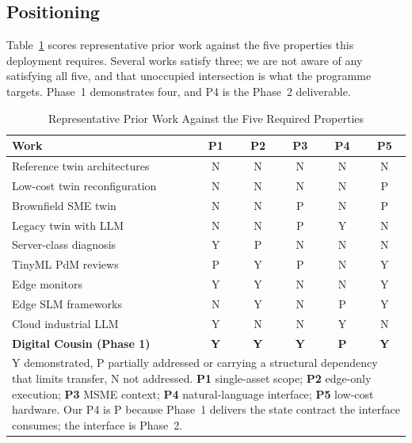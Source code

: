 \documentclass[conference]{IEEEtran}
\begin{document}
\subsection{Positioning}

Table~\ref{tab:gap} scores representative prior work against the five
properties this deployment requires. Several works satisfy three; we are not
aware of any satisfying all five, and that unoccupied intersection is what
the programme targets. Phase~1 demonstrates four, and P4 is the Phase~2
deliverable.

\begin{table}[t]
\caption{Representative Prior Work Against the Five Required Properties}
\label{tab:gap}
\centering
\footnotesize
\setlength{\tabcolsep}{4pt}
\begin{tabular}{|l|c|c|c|c|c|}
\hline
\textbf{Work} & \textbf{P1} & \textbf{P2} & \textbf{P3} & \textbf{P4} & \textbf{P5} \\
\hline
Reference twin architectures \cite{b1,b2,b3} & N & N & N & N & N \\
Low-cost twin reconfiguration \cite{b4} & N & N & N & N & P \\
Brownfield SME twin \cite{b5}     & N & N & P & N & P \\
Legacy twin with LLM \cite{b6}    & N & N & P & Y & N \\
Server-class diagnosis \cite{b10,b11,b13} & Y & P & N & N & N \\
TinyML PdM reviews \cite{b15,b35} & P & Y & P & N & Y \\
Edge monitors \cite{b16,b17,b20}  & Y & Y & N & N & Y \\
Edge SLM frameworks \cite{b23}    & N & Y & N & P & Y \\
Cloud industrial LLM \cite{b24,b25,b26,b27} & Y & N & N & Y & N \\
\hline
\textbf{Digital Cousin (Phase 1)} & \textbf{Y} & \textbf{Y} & \textbf{Y} & \textbf{P} & \textbf{Y} \\
\hline
\multicolumn{6}{p{0.95\columnwidth}}{\scriptsize Y demonstrated, P partially
addressed or carrying a structural dependency that limits transfer, N not
addressed. \textbf{P1} single-asset scope; \textbf{P2} edge-only execution;
\textbf{P3} MSME context; \textbf{P4} natural-language interface;
\textbf{P5} low-cost hardware. Our P4 is P because Phase~1 delivers the
state contract the interface consumes; the interface is Phase~2.} \\
\end{tabular}
\end{table}
\end{document}

